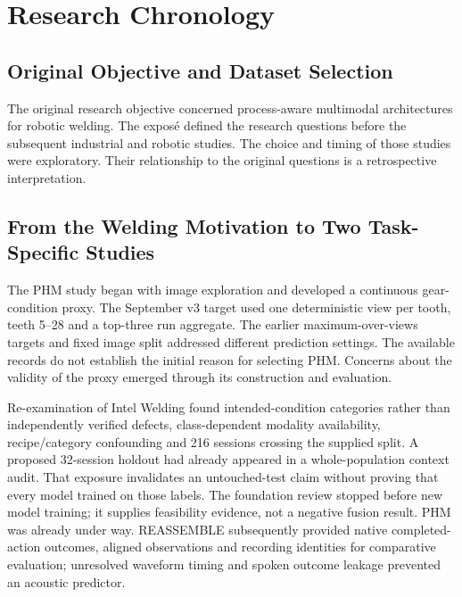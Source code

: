 \chapter{Research Chronology}
\label{app:chronology}
\section{Original Objective and Dataset Selection}
The original research objective concerned process-aware multimodal architectures for
robotic welding. The exposé defined the research questions before the subsequent
industrial and robotic studies. The choice and timing of those studies were exploratory.
Their relationship to the original questions is a retrospective
interpretation.

\section{From the Welding Motivation to Two Task-Specific Studies}
The PHM study began with image exploration and developed a continuous gear-condition
proxy. The September v3 target used one deterministic view per tooth, teeth 5--28 and a
top-three run aggregate. The earlier maximum-over-views targets and fixed image split
addressed different prediction settings. The available records do not establish the
initial reason for selecting PHM. Concerns about the validity of the proxy emerged
through its construction and evaluation.

Re-examination of Intel Welding found intended-condition categories rather than
independently verified defects, class-dependent modality availability, recipe/category
confounding and 216 sessions crossing the supplied split. A proposed 32-session holdout
had already appeared in a whole-population context audit. That exposure invalidates an
untouched-test claim without proving that every model trained on those labels. The
foundation review stopped before new model training; it supplies feasibility evidence,
not a negative fusion result. PHM was already under way. REASSEMBLE subsequently
provided native completed-action outcomes, aligned observations and recording identities
for comparative evaluation; unresolved waveform timing and spoken outcome leakage
prevented an acoustic predictor.

